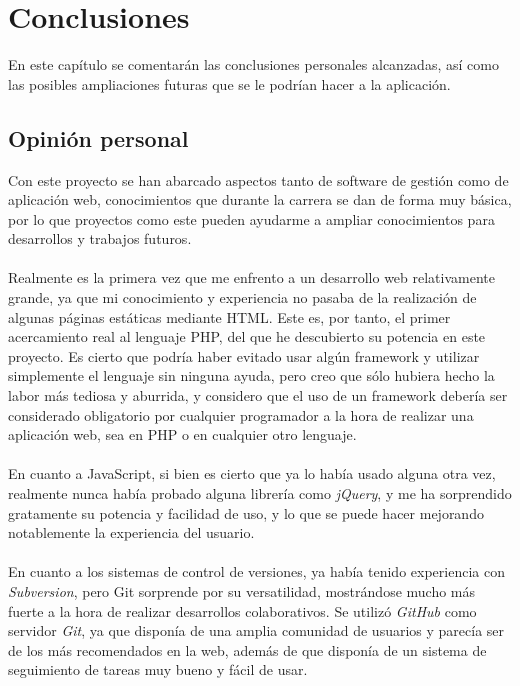 \documentclass[a4paper,11pt]{article} %
\begin{document}
\section{Conclusiones}

En este capítulo se comentarán las conclusiones personales alcanzadas, así como las posibles ampliaciones futuras que se le podrían hacer a la aplicación.

\subsection{Opinión personal}

Con este proyecto se han abarcado aspectos tanto de software de gestión como de aplicación web, conocimientos que durante la carrera se dan de forma muy básica, por lo que proyectos como este pueden ayudarme a ampliar conocimientos para desarrollos y trabajos futuros.
\paragraph{}
Realmente es la primera vez que me enfrento a un desarrollo web relativamente grande, ya que mi conocimiento y experiencia no pasaba de la realización de algunas páginas estáticas mediante HTML. Este es, por tanto, el primer acercamiento real al lenguaje PHP, del que he descubierto su potencia en este proyecto. Es cierto que podría haber evitado usar algún framework y utilizar simplemente el lenguaje sin ninguna ayuda, pero creo que sólo hubiera hecho la labor más tediosa y aburrida, y considero que el uso de un framework debería ser considerado obligatorio por cualquier programador a la hora de realizar una aplicación web, sea en PHP o en cualquier otro lenguaje.
\paragraph{}
En cuanto a JavaScript, si bien es cierto que ya lo había usado alguna otra vez, realmente nunca había probado alguna librería como  {\em jQuery}, y me ha sorprendido gratamente su potencia y facilidad de uso, y lo que se puede hacer mejorando notablemente la experiencia del usuario.
\paragraph{}
En cuanto a los sistemas de control de versiones, ya había tenido experiencia con {\em Subversion}, pero Git sorprende por su versatilidad, mostrándose mucho más fuerte a la hora de realizar desarrollos colaborativos. Se utilizó {\em GitHub} como servidor {\em Git}, ya que disponía de una amplia comunidad de usuarios y parecía ser de los más recomendados en la web, además de que disponía de un sistema de seguimiento de tareas muy bueno y fácil de usar.
\end{document}
